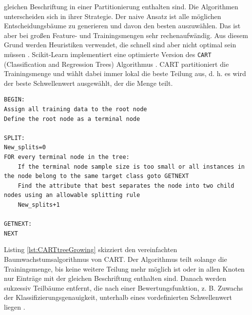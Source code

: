 gleichen Beschriftung in einer Partitionierung enthalten sind. Die Algorithmen unterscheiden sich in ihrer Strategie. Der naive Ansatz ist alle möglichen Entscheidungsbäume zu generieren und davon den besten auszuwählen.
Das ist aber bei großen Feature- und Trainingsmengen sehr rechenaufwändig. Aus diesem Grund werden Heuristiken verwendet, die schnell sind aber nicht optimal sein müssen \cite{quinlan1986induction}.
\newline
\newline
Scikit-Learn implementiert eine optimierte Version des \texttt{CART} (Classification and Regression Trees) Algorithmus \cite{ScikitLearnCART}.
CART partitioniert die Trainingsmenge und wählt dabei immer lokal die beste Teilung aus, d. h. es wird der beste Schwellenwert ausgewählt, der die Menge teilt.
\begin{lstlisting}[label=lst:CARTtreeGrowing,caption={Skizze vereinfachten Baumwachstumsalgorithmuses \cite{steinbergCART}.}]
BEGIN:
Assign all training data to the root node
Define the root node as a terminal node

SPLIT:
New_splits=0
FOR every terminal node in the tree:
    If the terminal node sample size is too small or all instances in the node belong to the same target class goto GETNEXT
    Find the attribute that best separates the node into two child nodes using an allowable splitting rule
    New_splits+1

GETNEXT:
NEXT
\end{lstlisting}
Listing \ref{lst:CARTtreeGrowing} skizziert den vereinfachten Baumwachstumsalgorithmus von CART. Der Algorithmus teilt solange die Trainingsmenge, bis keine weitere Teilung mehr möglich ist oder in allen Knoten nur
Einträge mit der gleichen Beschriftung enthalten sind. Danach werden sukzessiv Teilbäume entfernt, die nach einer Bewertungsfunktion, z. B. Zuwachs der Klassifizierungsgenauigkeit, unterhalb eines vordefinierten
Schwellenwert liegen \cite{steinbergCART}.
